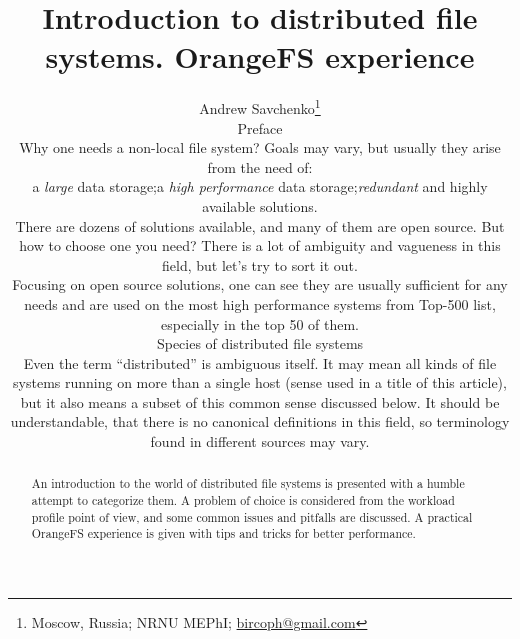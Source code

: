 \documentclass[10pt, a5paper]{article}
\begin{document}
\title{Introduction to distributed file systems. OrangeFS experience}
\author{Andrew Savchenko\footnote{Moscow, Russia; NRNU MEPhI; \url{bircoph@gmail.com}}
\maketitle
\begin{abstract}
An introduction to the world of distributed file systems is presented with a humble attempt to categorize them. A problem of choice is
considered from the workload profile point of view, and some common issues and pitfalls are discussed. A practical OrangeFS experience is
given with tips and tricks for better performance.
\end{abstract}
\section*{Preface}

Why one needs a non-local file system? Goals may vary, but usually they arise from the need of:

\begin{itemize}
  \item a \emph{large} data storage;
  \item a \emph{high performance} data storage;
  \item \emph{redundant} and highly available solutions.
\end{itemize}

There are dozens of solutions available\cite{bib1}, and many of them are open source. But how to choose one you need? There is a lot of ambiguity and vagueness in this field, but let's try to sort it out.

Focusing on open source solutions, one can see they are usually sufficient for any needs and are used on the most high performance systems from Top-500\cite{bib2} list, especially in the top 50 of them.

\section*{Species of distributed file systems}

Even the term ``distributed'' is ambiguous itself. It may mean all kinds of file systems running on more than a single host (sense used in a title of this article), but it also means a subset of this common sense discussed below. It should be understandable, that there is no canonical definitions in this field, so terminology found in different sources may vary.

}
\end{document}

